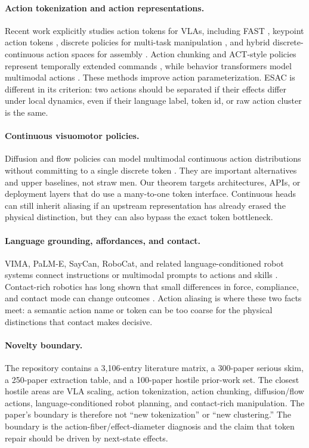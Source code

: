 \documentclass{article}
\begin{document}
\paragraph{Action tokenization and action representations.}
Recent work explicitly studies action tokens for VLAs, including FAST
\citep{pertsch2025fast}, keypoint action tokens
\citep{dipalo2024keypoint}, discrete policies for multi-task manipulation
\citep{wu2025discrete}, and hybrid discrete-continuous action spaces for
assembly \citep{zhang2022hybrid}. Action chunking and ACT-style policies
represent temporally extended commands \citep{zhao2023act}, while behavior
transformers model multimodal actions \citep{shafiullah2022behavior}. These
methods improve action parameterization. ESAC is different in its criterion:
two actions should be separated if their effects differ under local dynamics,
even if their language label, token id, or raw action cluster is the same.

\paragraph{Continuous visuomotor policies.}
Diffusion and flow policies can model multimodal continuous action
distributions without committing to a single discrete token
\citep{chi2024diffusion,black2024pi0}. They are important alternatives and
upper baselines, not straw men. Our theorem targets architectures, APIs, or
deployment layers that do use a many-to-one token interface. Continuous heads
can still inherit aliasing if an upstream representation has already erased the
physical distinction, but they can also bypass the exact token bottleneck.

\paragraph{Language grounding, affordances, and contact.}
VIMA, PaLM-E, SayCan, RoboCat, and related language-conditioned robot systems
connect instructions or multimodal prompts to actions and skills
\citep{jiang2022vima,driess2023palme,ahn2022saycan,bousmalis2023robocat}.
Contact-rich robotics has long shown that small differences in force,
compliance, and contact mode can change outcomes \citep{koval2015contact}.
Action aliasing is where these two facts meet: a semantic action name or token
can be too coarse for the physical distinctions that contact makes decisive.

\paragraph{Novelty boundary.}
The repository contains a 3,106-entry literature matrix, a 300-paper serious
skim, a 250-paper extraction table, and a 100-paper hostile prior-work set. The
closest hostile areas are VLA scaling, action tokenization, action chunking,
diffusion/flow actions, language-conditioned robot planning, and contact-rich
manipulation. The paper's boundary is therefore not ``new tokenization'' or
``new clustering.'' The boundary is the action-fiber/effect-diameter diagnosis
and the claim that token repair should be driven by next-state effects.
\end{document}
